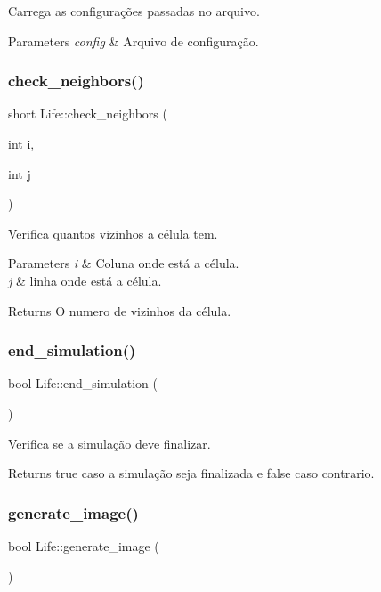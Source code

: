 Carrega as configurações passadas no arquivo. 
\begin{DoxyParams}{Parameters}
{\em config} & Arquivo de configuração. \\
\hline
\end{DoxyParams}
\mbox{\label{class_life_a839cc897ab42c2bc795f53011127b32f}} 
\subsubsection{check\+\_\+neighbors()}
{\footnotesize\ttfamily short Life\+::check\+\_\+neighbors (\begin{DoxyParamCaption}\item[{int}]{i,  }\item[{int}]{j }\end{DoxyParamCaption})}

Verifica quantos vizinhos a célula tem. 
\begin{DoxyParams}{Parameters}
{\em i} & Coluna onde está a célula. \\
\hline
{\em j} & linha onde está a célula. \\
\hline
\end{DoxyParams}
\begin{DoxyReturn}{Returns}
O numero de vizinhos da célula. 
\end{DoxyReturn}
\mbox{\label{class_life_acd418ca066af49070b3b21c3e1352bfd}} 
\subsubsection{end\+\_\+simulation()}
{\footnotesize\ttfamily bool Life\+::end\+\_\+simulation (\begin{DoxyParamCaption}{ }\end{DoxyParamCaption})}

Verifica se a simulação deve finalizar. \begin{DoxyReturn}{Returns}
true caso a simulação seja finalizada e false caso contrario. 
\end{DoxyReturn}
\mbox{\label{class_life_af1481fc5bc8a7efd7e953af6a4fa8c8a}} 
\subsubsection{generate\+\_\+image()}
{\footnotesize\ttfamily bool Life\+::generate\+\_\+image (\begin{DoxyParamCaption}{ }\end{DoxyParamCaption})}


